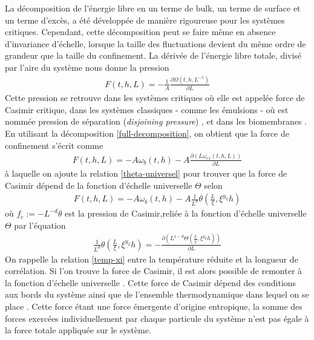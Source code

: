 La décomposition de l'énergie libre en un terme de bulk, un terme de surface et un terme d'excès, a été développée de manière rigoureuse pour les systèmes critiques. Cependant, cette décomposition peut se faire même en absence d'invariance d'échelle, lorsque la taille des fluctuations devient du même ordre de grandeur que la taille du confinement. La dérivée de l'énergie libre totale, divisé par l'aire du système nous donne la pression
\begin{align}
    F(t,h,L) = -\frac{1}{A} \frac{\partial \Omega(t,h,L^{-1})}{\partial L}
\end{align}
Cette pression se retrouve dans les systèmes critiques\cite{degennes} où elle est appelée force de Casimir critique, dans les systèmes classiques - comme les émulsions - où est nommée pression de séparation (\textit{disjoining pressure})  \cite{stubenrauch_disjoining_2003}, et dans les biomembranes \cite{bitbol_fluctuations_2010}.
En utilisant la décomposition \ref{full-decomposition}, on obtient que la force de confinement s'écrit comme
\begin{align}
    F(t,h,L) = - A \omega_b(t,h) - A \frac{\partial(L \omega_{ex}(t,h,L))}{\partial L}
\end{align}
à laquelle on ajoute la relation \ref{theta-universel} pour trouver que la force de Casimir dépend de la fonction d'échelle universelle $\Theta$ selon
\begin{align}
    F(t,h,L) = - A \omega_b(t,h) - A \frac{1}{L^d} \theta(\frac{L}{\xi},\xi^{y_2}h)
\end{align}
où $f_c := -L^{-d} \theta$ est la pression de Casimir,reliée à la fonction d'échelle universelle $\Theta$ par l'équation 
\begin{align}
    \frac{1}{L^d }\theta(\frac{L}{\xi},\xi^{y_2}h) = - \frac{\partial (L^{1-d} \Theta(\frac{L}{\xi},\xi^{y_2}h))}{\partial L}
\end{align}
On rappelle la relation \ref{temp-xi} entre la température réduite et la longueur de corrélation.
Si l'on trouve la force de Casimir, il est alors possible de remonter à la fonction d'échelle universelle \cite{vasilyev_universal_2009}. Cette force de Casimir dépend des conditions aux bords du système \cite{dantchev_casimir_2017,dantchev_exact_2016} ainsi que de l'ensemble thermodynamique dans lequel on se place \cite{gross_critical_2016,rohwer_transient_2017}. 
 Cette force étant une force émergente d'origine entropique, la somme des forces exercées individuellement par chaque particule du système n'est pas égale à la force totale appliquée sur le système\cite{paladugu_nonadditivity_2016}.

